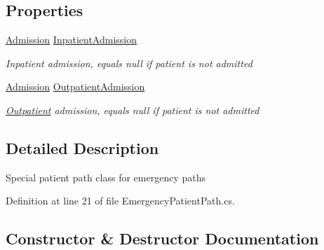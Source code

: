 \subsection*{Properties}
\begin{DoxyCompactItemize}
\item 
\hyperlink{class_general_health_care_elements_1_1_treatment_admission_types_1_1_admission}{Admission} \hyperlink{class_general_health_care_elements_1_1_department_models_1_1_emergency_1_1_emergency_patient_path_a386a429226723fbc8bd83012dccd8fbb}{Inpatient\+Admission}
\begin{DoxyCompactList}\small\item\em Inpatient admission, equals null if patient is not admitted \end{DoxyCompactList}\item 
\hyperlink{class_general_health_care_elements_1_1_treatment_admission_types_1_1_admission}{Admission} \hyperlink{class_general_health_care_elements_1_1_department_models_1_1_emergency_1_1_emergency_patient_path_a16e4a1e5e90c97479e23d75da3efae13}{Outpatient\+Admission}
\begin{DoxyCompactList}\small\item\em \hyperlink{namespace_general_health_care_elements_1_1_department_models_1_1_outpatient}{Outpatient} admission, equals null if patient is not admitted \end{DoxyCompactList}\end{DoxyCompactItemize}


\subsection{Detailed Description}
Special patient path class for emergency paths 



Definition at line 21 of file Emergency\+Patient\+Path.\+cs.



\subsection{Constructor \& Destructor Documentation}
